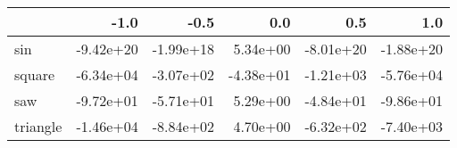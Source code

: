 \begin{tabular}{lrrrrr}
\toprule
{} &      -1.0 &      -0.5 &       0.0 &       0.5 &       1.0 \\
\midrule
sin      & -9.42e+20 & -1.99e+18 &  5.34e+00 & -8.01e+20 & -1.88e+20 \\
square   & -6.34e+04 & -3.07e+02 & -4.38e+01 & -1.21e+03 & -5.76e+04 \\
saw      & -9.72e+01 & -5.71e+01 &  5.29e+00 & -4.84e+01 & -9.86e+01 \\
triangle & -1.46e+04 & -8.84e+02 &  4.70e+00 & -6.32e+02 & -7.40e+03 \\
\bottomrule
\end{tabular}
